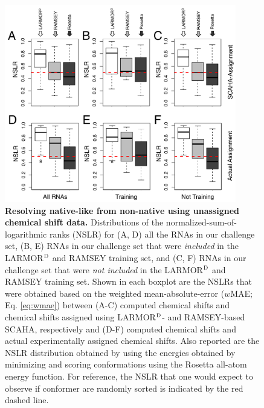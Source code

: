 \documentclass[journal=jcisd8,manuscript=article,layout=onecolumn]{achemso}
\begin{document}
\begin{figure}[h!]
  \centering
       \includegraphics[width=0.9\textwidth]{figure_4}
  \caption{\textbf{Resolving native-like from non-native using unassigned chemical shift data.} Distributions of the normalized-sum-of-logarithmic ranks (NSLR) for (A, D) all the RNAs in our challenge set, (B, E) RNAs in our challenge set that were \textit{included} in the LARMOR$^{\rm D}$ and RAMSEY training set, and (C, F) RNAs in our challenge set that were \textit{not included} in the LARMOR$^{\rm D}$ and RAMSEY training set. Shown in each boxplot are the NSLRs that were obtained based on the weighted mean-absolute-error ($w$MAE; Eq. \ref{eq:wmae}) between (A-C) computed chemical shifts and chemical shifts assigned using LARMOR$^{\rm D}$- and RAMSEY-based SCAHA, respectively and (D-F) computed chemical shifts and actual experimentally assigned chemical shifts.  Also reported are the NSLR distribution obtained by using the energies obtained by minimizing and scoring conformations using the Rosetta all-atom energy function\cite{alford2017rosetta}. For reference, the NSLR that one would expect to observe if conformer are randomly sorted is indicated by the red dashed line.}
  \label{fig:sensitivities}
\end{figure}
\end{document}
